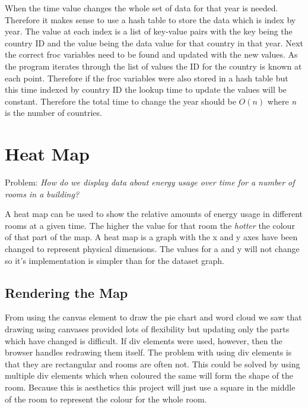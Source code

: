 When the time value changes the whole set of data for that year is needed. Therefore it makes sense to use a hash table to store the data which is index by year. The value at each index is a list of key-value pairs with the key being the country ID and the value being the data value for that country in that year. Next the correct froc variables need to be found and updated with the new values. As the program iterates through the list of values the ID for the country is known at each point. Therefore if the froc variables were also stored in a hash table but this time indexed by country ID the lookup time to update the values will be constant. Therefore the total time to change the year should be \texttt{$O(n)$} where \emph{n} is the number of countries. 

\section{Heat Map}
Problem: \emph{How do we display data about energy usage over time for a number of rooms in a building?}

A heat map can be used to show the relative amounts of energy usage in different rooms at a given time. The higher the value for that room the \emph{hotter} the colour of that part of the map. A heat map is a graph with the x and y axes have been changed to represent physical dimensions. The values for a and y will not change so it's implementation is simpler than for the dataset graph.

\subsection{Rendering the Map}
From using the canvas element to draw the pie chart and word cloud we saw that drawing using canvases provided lots of flexibility but updating only the parts which have changed is difficult. If div elements were used, however, then the browser handles redrawing them itself. The problem with using div elements is that they are rectangular and rooms are often not. This could be solved by using multiple div elements which when coloured the same will form the shape of the room. Because this is aesthetics this project will just use a square in the middle of the room to represent the colour for the whole room.
